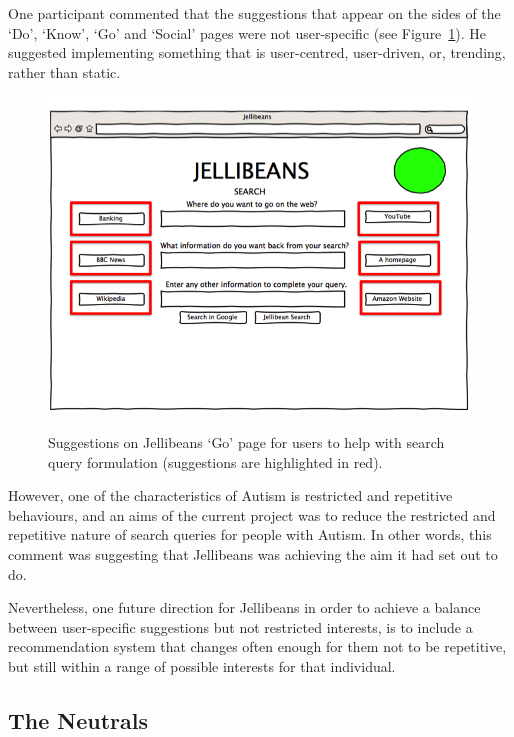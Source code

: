 \documentclass[a4paper, 11pt]{article}
\begin{document}
\vspace{5mm}
One participant commented that the suggestions that appear on the sides of the `Do', `Know', `Go' and `Social' pages were not user-specific (see Figure~\ref{suggestions}). He suggested implementing something that is user-centred, user-driven, or, trending, rather than static.

\begin{figure}[H]
\begin{center}
\includegraphics[scale=0.3]{suggestions}\\
\caption{Suggestions on Jellibeans `Go' page for users to help with search query formulation (suggestions are highlighted in red).}
\label{suggestions}
\end{center}
\end{figure}

However, one of the characteristics of Autism is restricted and repetitive behaviours, and an aims of the current project was to reduce the restricted and repetitive nature of search queries for people with Autism. In other words, this comment was suggesting that Jellibeans was achieving the aim it had set out to do.

\vspace{5mm}
Nevertheless, one future direction for Jellibeans in order to achieve a balance between user-specific suggestions but not restricted interests, is to include a recommendation system that changes often enough for them not to be repetitive, but still within a range of possible interests for that individual. 

\subsection{The Neutrals}
\end{document}
